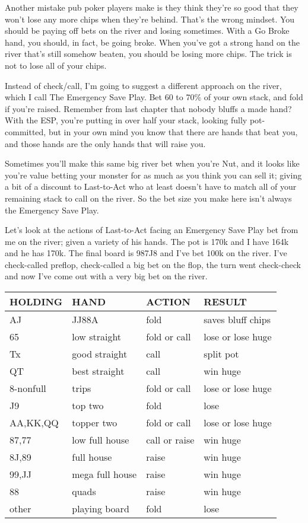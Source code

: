 Another mistake pub poker players make is they think they're so good
that they won't lose any more chips when they're behind. That's the
wrong mindset. You should be paying off bets on the river and losing
sometimes. With a Go Broke hand, you should, in fact, be going broke.
When you've got a strong hand on the river that's still
somehow beaten, you should be losing more chips. The trick is not
to lose all of your chips.

Instead of check/call, I'm going to suggest a different approach on
the river, which I call The Emergency Save Play. Bet 60 to 70\% of
your own stack, and fold if you're raised. Remember from last chapter
that nobody bluffs a made hand? With the ESP, you're putting in over
half your stack, looking fully pot-committed, but in your own mind you
know that there are hands that beat you, and those hands are the
only hands that will raise you.

Sometimes you'll make this same big river bet when you're Nut, and it
looks like you're value betting your monster for as much as you think
you can sell it; giving a bit of a discount to Last-to-Act who at
least doesn't have to match all of your remaining stack to call on the
river. So the bet size you make here isn't always the Emergency Save
Play.

Let's look at the actions of Last-to-Act facing an Emergency Save Play
bet from me on the river; given a variety of his hands. The pot is
170k and I have 164k and he has 170k. The final board is 987J8 and
I've bet 100k on the river. I've check-called preflop, check-called a
big bet on the flop, the turn went check-check and now I've come out
with a very big bet on the river.

\begin{tabular}{|l|l|l|l|} \hline
HOLDING & HAND & ACTION & RESULT\\ \hline
AJ      & JJ88A & fold  & saves bluff chips\\ \hline
65      & low straight  & fold or call & lose or lose huge\\ \hline
Tx      & good straight & call & split pot\\ \hline
QT      & best straight & call & win huge\\ \hline
8-nonfull & trips       & fold or call & lose or lose huge\\ \hline
J9      & top two       & fold & lose\\ \hline
AA,KK,QQ & topper two   & fold or call  & lose or lose huge\\ \hline
87,77 & low full house  & call or raise & win huge\\ \hline
8J,89 & full house      & raise & win huge\\ \hline
99,JJ & mega full house & raise & win huge\\ \hline
88      & quads         & raise & win huge\\ \hline
other   & playing board & fold  & lose\\ \hline
\end{tabular}

